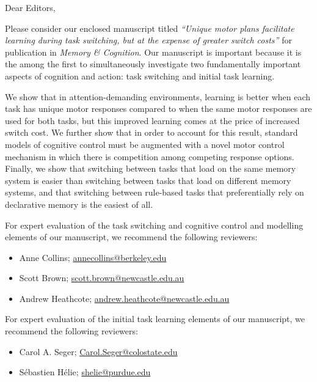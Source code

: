 \documentclass[10pt]{article}
\begin{document}
\thispagestyle{fancy}
Dear Editors,

Please consider our enclosed manuscript titled
\textit{``Unique motor plans facilitate learning during task
switching, but at the expense of greater switch costs''} for
publication in \textit{Memory \& Cognition}. Our manuscript
is important because it is the among the first to
simultaneously investigate two fundamentally important
aspects of cognition and action: task switching and initial
task learning. 

We show that in attention-demanding environments, learning
is better when each task has unique motor responses compared
to when the same motor responses are used for both tasks,
but this improved learning comes at the price of increased
switch cost. We further show that in order to account for
this result, standard models of cognitive control must be
augmented with a novel motor control mechanism in which
there is competition among competing response options.
Finally, we show that switching between tasks that load on
the same memory system is easier than switching between
tasks that load on different memory systems, and that
switching between rule-based tasks that preferentially rely
on declarative memory is the easiest of all.

For expert evaluation of the task switching and cognitive
control and modelling elements of our manuscript, we
recommend the following reviewers:

\begin{itemize}
    \item Anne Collins; \href{mailto:annecollins@berkeley.edu}{annecollins@berkeley.edu}
    \item Scott Brown; \href{mailto:scott.brown@newcastle.edu.au}{scott.brown@newcastle.edu.au}
    \item Andrew Heathcote; \href{mailto:andrew.heathcote@newcastle.edu.au}{andrew.heathcote@newcastle.edu.au}
\end{itemize}

For expert evaluation of the initial task learning elements
of our manuscript, we recommend the following reviewers:

\begin{itemize}
    \item Carol A. Seger; \href{mailto:Carol.Seger@colostate.edu}{Carol.Seger@colostate.edu}
    \item S\'ebastien H\'elie; \href{mailto:shelie@purdue.edu}{shelie@purdue.edu}
\end{itemize}
\end{document}
